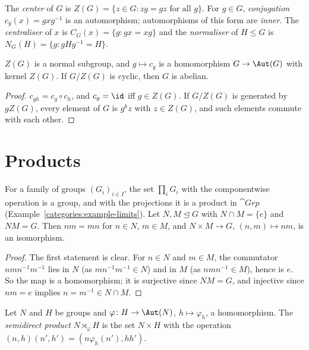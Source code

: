 \begin{definition}\label{groups:definition-center-conjugation}
The \emph{center} of $G$ is $Z(G) = \{z \in G : zg = gz \text{ for all } g\}$. For
$g \in G$, \emph{conjugation} $c_g(x) = gxg^{-1}$ is an automorphism; automorphisms
of this form are \emph{inner}. The \emph{centraliser} of $x$ is
$C_G(x) = \{g : gx = xg\}$ and the \emph{normaliser} of $H \leq G$ is
$N_G(H) = \{g : gHg^{-1} = H\}$.
\end{definition}

\begin{lemma}\label{groups:lemma-center-cyclic}
$Z(G)$ is a normal subgroup, and $g \mapsto c_g$ is a homomorphism
$G \to \Aut(G)$ with kernel $Z(G)$. If $G/Z(G)$ is cyclic, then $G$ is abelian.
\end{lemma}

\begin{proof}
$c_{gh} = c_g \circ c_h$, and $c_g = \id$ iff $g \in Z(G)$. If $G/Z(G)$ is generated
by $gZ(G)$, every element of $G$ is $g^k z$ with $z \in Z(G)$, and such elements
commute with each other.
\end{proof}

\section{Products}\label{groups:section-products}

\begin{proposition}\label{groups:proposition-products}
For a family of groups $(G_i)_{i \in I}$, the set $\prod_i G_i$ with the componentwise
operation is a group, and with the projections it is a product in $\cat{Grp}$
(Example~\ref{categories:example-limits}). Let $N, M \trianglelefteq G$ with
$N \cap M = \{e\}$ and $NM = G$. Then $nm = mn$ for $n \in N$, $m \in M$, and
$N \times M \to G$, $(n, m) \mapsto nm$, is an isomorphism.
\end{proposition}

\begin{proof}
The first statement is clear. For $n \in N$ and $m \in M$, the commutator
$nmn^{-1}m^{-1}$ lies in $N$ (as $mn^{-1}m^{-1} \in N$) and in $M$ (as
$nmn^{-1} \in M$), hence is $e$. So the map is a homomorphism; it is surjective
since $NM = G$, and injective since $nm = e$ implies $n = m^{-1} \in N \cap M$.
\end{proof}

\begin{definition}\label{groups:definition-semidirect}
Let $N$ and $H$ be groups and $\varphi \colon H \to \Aut(N)$, $h \mapsto \varphi_h$, a
homomorphism. The \emph{semidirect product} $N \rtimes_\varphi H$ is the set
$N \times H$ with the operation $(n, h)(n', h') = (n\varphi_h(n'), hh')$.
\end{definition}

